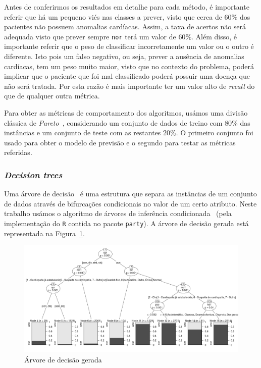 \documentclass[10pt, conference, compsocconf]{IEEEtran}
\begin{document}
Antes de conferirmos os resultados em detalhe para cada método, é
importante referir que há um pequeno viés nas classes a prever, visto
que cerca de $60\%$ dos pacientes não possuem anomalias
cardíacas. Assim, a taxa de acertos não será adequada visto que prever
sempre {\tt nor} terá um valor de $60\%$. Além disso, é importante
referir que o peso de classificar incorretamente um valor ou o outro é
diferente. Isto pois um falso negativo, ou seja, prever a ausência de
anomalias cardíacas, tem um peso muito maior, visto que no contexto do
problema, poderá implicar que o paciente que foi mal classificado
poderá possuir uma doença que não será tratada. Por esta razão é mais
importante ter um valor alto de \textit{recall} do que de qualquer
outra métrica.

Para obter as métricas de comportamento dos algoritmos, usámos uma
divisão clássica de \textit{Pareto}~\cite{pareto1964cours},
considerando um conjunto de dados de treino com $80\%$ das instâncias
e um conjunto de teste com as restantes $20\%$. O primeiro conjunto
foi usado para obter o modelo de previsão e o segundo para testar as
métricas referidas.


\subsubsection{\textit{Decision trees}}
Uma árvore de decisão~\cite{quinlan2014c4} é uma estrutura que separa
as instâncias de um conjunto de dados através de bifurcações
condicionais no valor de um certo atributo. Neste trabalho usámos o
algoritmo de árvores de inferência
condicionada~\cite{hothorn2006unbiased} (pela implementação do {\tt R}
contida no pacote {\tt party}). A árvore de decisão gerada está
representada na Figura~\ref{fig:aprct}.

\begin{figure}[!ht]
  \centering
  \includegraphics[scale=0.5]{img/apr_ctree.png}
  \caption{Árvore de decisão gerada}
  \label{fig:aprct}
\end{figure}
\end{document}
